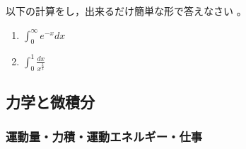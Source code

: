 \documentclass[twocolumn,11pt]{jarticle}
\begin{document}
\question
以下の計算をし，出来るだけ簡単な形で答えなさい
。
\begin{enumerate}
\item\label{eq:int2:e^(-x)}   $\displaystyle\int_0^{\infty}e^{-x}dx$
\item\label{eq:int2:x^(-2/3)}   $\displaystyle\int_0^1\frac{dx}{x^{\frac{2}{3}}}$
\end{enumerate}

\subsection{力学と微積分}

\subsubsection{運動量・力積・運動エネルギー・仕事}
\end{document}
